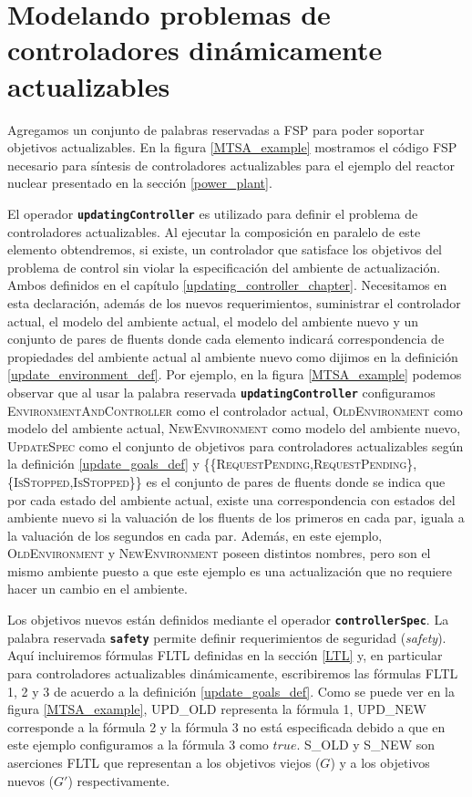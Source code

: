 \section{Modelando problemas de controladores dinámicamente actualizables}

Agregamos un conjunto de palabras reservadas a FSP para poder soportar objetivos actualizables. En la figura
\ref{MTSA_example} mostramos el código FSP necesario para síntesis de controladores actualizables para el ejemplo del reactor nuclear
presentado en la sección \ref{power_plant}.

El operador \texttt{\textbf{updatingController}} es utilizado para definir el problema de controladores
actualizables. Al ejecutar la composición en paralelo de este elemento obtendremos, si existe, un controlador que satisface los
objetivos del problema de control sin violar la especificación del ambiente de actualización. Ambos definidos en el
capítulo \ref{updating_controller_chapter}. Necesitamos en esta declaración, además de los nuevos requerimientos, suministrar
el controlador actual, el modelo del ambiente actual, el modelo del ambiente nuevo y un conjunto de pares de fluents
donde cada elemento indicará correspondencia de propiedades del ambiente actual al ambiente nuevo como dijimos en la
definición \ref{update_environment_def}. Por ejemplo, en la figura \ref{MTSA_example} podemos observar que al usar la
palabra reservada \texttt{\textbf{updatingController}} configuramos \textsc{EnvironmentAndController} como el
controlador actual, \textsc{OldEnvironment} como modelo del ambiente actual, \textsc{NewEnvironment} como modelo del
ambiente nuevo, \textsc{UpdateSpec} como el conjunto de objetivos para controladores actualizables según la
definición \ref{update_goals_def} y \textsc{\{\{RequestPending,RequestPending\},
\{IsStopped,IsStopped\}\}} es el conjunto de pares de fluents donde se indica que por cada estado del ambiente actual,
existe una correspondencia con estados del ambiente nuevo si la valuación de los fluents de los primeros en cada par,
iguala a la valuación de los segundos en cada par. Además, en este ejemplo, \textsc{OldEnvironment} y
\textsc{NewEnvironment} poseen distintos nombres, pero son el mismo ambiente puesto a que este ejemplo es una
actualización que no requiere hacer un cambio en el ambiente.

Los objetivos nuevos están definidos mediante el operador \texttt{\textbf{controllerSpec}}. La palabra reservada
\texttt{\textbf{safety}} permite definir requerimientos de seguridad (\emph{safety}). Aquí incluiremos fórmulas
FLTL definidas en la sección \ref{LTL} y, en particular para controladores actualizables dinámicamente, escribiremos las
fórmulas FLTL 1, 2 y 3 de acuerdo a la definición \ref{update_goals_def}. Como se puede ver en la figura \ref{MTSA_example},
\textsc{UPD\_OLD} representa la fórmula 1, \textsc{UPD\_NEW} corresponde a la fórmula 2 y la fórmula 3 no está
especificada debido a que en este ejemplo configuramos a la fórmula 3 como $true$. \textsc{S\_OLD} y \textsc{S\_NEW} son
aserciones FLTL que representan a los objetivos viejos ($G$) y a los objetivos nuevos ($G'$) respectivamente.

